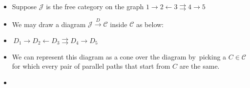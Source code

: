 \begin{itemize}
    \item Suppose $\mathcal{J}$ is the free category on the graph $\boxed{1 \rightarrow 2 \leftarrow 3 \rightrightarrows 4 \rightarrow 5}$
    \item We may draw a diagram $\mathcal{J}\xrightarrow{D}\mathcal{C}$ inside $\mathcal{C}$ as below:
    \item \,$\boxed{D_1 \rightarrow D_2 \leftarrow D_3 \rightrightarrows D_4 \rightarrow D_5}$\,
    \item We can represent this diagram as a cone over the diagram by \,picking a $C \in \mathcal{C}$ for which every pair of parallel paths that start from $C$ are the same.
    \item {}\,
  \end{itemize}
